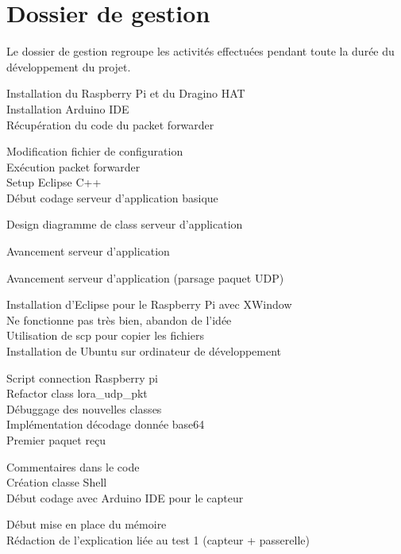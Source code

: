 \chapter{Dossier de gestion}

Le dossier de gestion regroupe les activités effectuées pendant toute la durée du développement du projet.

\begin{multicols}{2}

Installation du Raspberry Pi et du Dragino HAT\\
Installation Arduino IDE\\
Récupération du code du packet forwarder

Modification fichier de configuration\\
Exécution packet forwarder\\
Setup Eclipse C++\\
Début codage serveur d'application basique

Design diagramme de class serveur d'application

Avancement serveur d'application

Avancement serveur d'application (parsage paquet UDP)

Installation d'Eclipse pour le Raspberry Pi avec XWindow\\
Ne fonctionne pas très bien, abandon de l'idée\\
Utilisation de scp pour copier les fichiers\\
Installation de Ubuntu sur ordinateur de développement

Script connection Raspberry pi\\
Refactor class lora\_udp\_pkt\\
Débuggage des nouvelles classes\\
Implémentation décodage donnée base64\\
Premier paquet reçu

Commentaires dans le code\\
Création classe Shell\\
Début codage avec Arduino IDE pour le capteur

Début mise en place du mémoire\\
Rédaction de l’explication liée au test 1 (capteur + passerelle)


\end{multicols}

